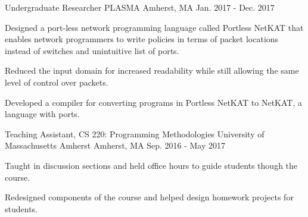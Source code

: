 

\begin{cventries}

  \cventry
    {Undergraduate Researcher} %
    {PLASMA} %
    {Amherst, MA} %
    {Jan. 2017 - Dec. 2017} %
    {
      \begin{cvitems} %
        \item Designed a port-less network programming language called Portless NetKAT that enables network programmers to write policies in terms of packet locations instead of switches and unintuitive list of ports. 
        \item Reduced the input domain for increased readability while still allowing the same level of control over packets.
        \item Developed a compiler for converting programs in Portless NetKAT to NetKAT, a language with ports.
      \end{cvitems}
    }

  \cventry
    {Teaching Assistant, CS 220: Programming Methodologies} %
    {University of Massachusetts Amherst} %
    {Amherst, MA} %
    {Sep. 2016 - May 2017} %
    {
      \begin{cvitems} %
      	\item Taught in discussion sections and held office hours to guide students though the course.
        \item Redesigned components of the course and helped design homework projects for students.
      \end{cvitems}
    }

\end{cventries}
